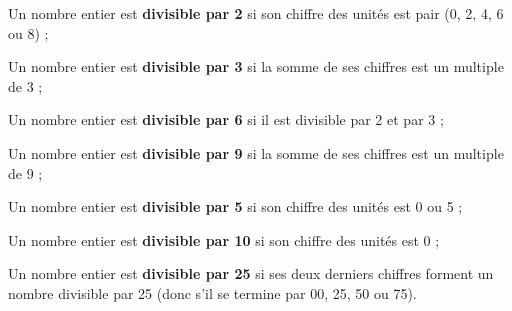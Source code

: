   
\begin{aconnaitre}
Un nombre entier est \textbf{\textcolor{A1}{divisible par 2}} si son chiffre des unités est pair (0, 2, 4, 6 ou 8) ;

Un nombre entier est \textbf{\textcolor{A1}{divisible par 3}} si la somme de ses chiffres est un multiple de 3 ;

Un nombre entier est \textbf{\textcolor{A1}{divisible par 6}} si il est divisible par 2 et par 3 ;

Un nombre entier est \textbf{\textcolor{A1}{divisible par 9}} si la somme de ses chiffres est un multiple de 9 ;

Un nombre entier est \textbf{\textcolor{A1}{divisible par 5}} si son chiffre des unités est 0 ou 5 ;

Un nombre entier est \textbf{\textcolor{A1}{divisible par 10}} si son chiffre des unités est 0 ;

Un nombre entier est \textbf{\textcolor{A1}{divisible par 25}} si ses deux derniers chiffres forment un nombre divisible par 25 (donc s'il se termine par 00, 25, 50 ou 75).
\end{aconnaitre}




